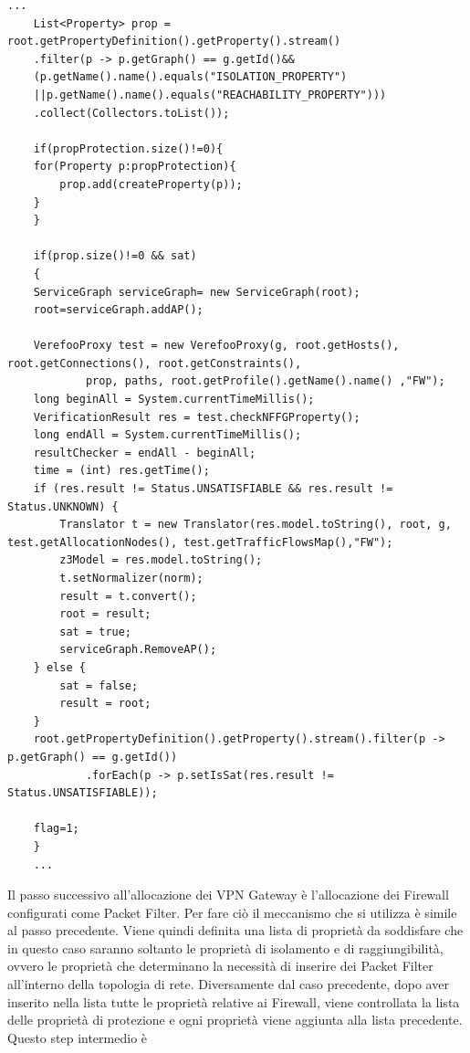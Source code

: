 \begin{lstlisting}[caption={Iterazione di allocazione Firewall}, label=lst:java_example4]
    ... 
    List<Property> prop = root.getPropertyDefinition().getProperty().stream()
    .filter(p -> p.getGraph() == g.getId()&& 
    (p.getName().name().equals("ISOLATION_PROPERTY")
    ||p.getName().name().equals("REACHABILITY_PROPERTY")))
    .collect(Collectors.toList());

    if(propProtection.size()!=0){
    for(Property p:propProtection){
        prop.add(createProperty(p));
    }
    }

    if(prop.size()!=0 && sat)
    {
    ServiceGraph serviceGraph= new ServiceGraph(root);
    root=serviceGraph.addAP();

    VerefooProxy test = new VerefooProxy(g, root.getHosts(), root.getConnections(), root.getConstraints(),
            prop, paths, root.getProfile().getName().name() ,"FW");
    long beginAll = System.currentTimeMillis();
    VerificationResult res = test.checkNFFGProperty();
    long endAll = System.currentTimeMillis();
    resultChecker = endAll - beginAll;
    time = (int) res.getTime();
    if (res.result != Status.UNSATISFIABLE && res.result != Status.UNKNOWN) {
        Translator t = new Translator(res.model.toString(), root, g, test.getAllocationNodes(), test.getTrafficFlowsMap(),"FW");
        z3Model = res.model.toString();
        t.setNormalizer(norm);
        result = t.convert();
        root = result;
        sat = true;
        serviceGraph.RemoveAP();
    } else {
        sat = false;
        result = root;
    }
    root.getPropertyDefinition().getProperty().stream().filter(p -> p.getGraph() == g.getId())
            .forEach(p -> p.setIsSat(res.result != Status.UNSATISFIABLE));

    flag=1;
    }
    ... 
\end{lstlisting}
Il passo successivo all'allocazione dei VPN Gateway è l'allocazione dei Firewall configurati come Packet Filter. Per fare ciò il meccanismo che si utilizza è simile al
passo precedente. Viene quindi definita una lista di proprietà da soddisfare che in questo caso saranno soltanto le proprietà di isolamento e di raggiungibilità,
ovvero le proprietà che determinano la necessità di inserire dei Packet Filter all'interno della topologia di rete. Diversamente dal caso precedente, dopo aver inserito nella
lista tutte le proprietà relative ai Firewall, viene controllata la lista delle proprietà di protezione e ogni proprietà viene aggiunta alla lista precedente. Questo step intermedio è 
